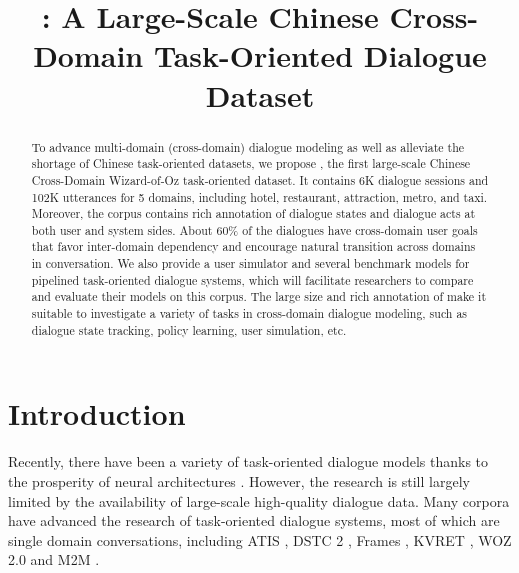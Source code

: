 \title{\datasetName: A Large-Scale Chinese Cross-Domain Task-Oriented Dialogue Dataset}



\maketitle

\renewcommand{\thefootnote}{\fnsymbol{footnote}}

\begin{abstract}
To advance multi-domain (cross-domain) dialogue modeling as well as alleviate the shortage of Chinese task-oriented datasets, we propose \textbf{\datasetName}, the first large-scale Chinese Cross-Domain Wizard-of-Oz task-oriented dataset. It contains 6K dialogue sessions and 102K utterances for 5 domains, including hotel, restaurant, attraction, metro, and taxi. Moreover, the corpus contains rich annotation of dialogue states and dialogue acts at both user and system sides. About 60\% of the dialogues have cross-domain user goals that favor inter-domain dependency and encourage natural transition across domains in conversation. We also provide a user simulator and several benchmark models for pipelined task-oriented dialogue systems, which will facilitate researchers to compare and evaluate their models on this corpus.
The large size and rich annotation of \textbf{\datasetName} make it suitable to investigate a variety of tasks in cross-domain dialogue modeling, such as dialogue state tracking, policy learning, user simulation, etc.
\end{abstract}

\section{Introduction}
\label{section1}
Recently, there have been a variety of task-oriented dialogue models thanks to the prosperity of neural architectures \cite{yao2013rnnNLU,wen2015sclstm,mrkvsic2017neuralDST,HRL,lei2018sequicity,gur2018user}. 
However, the research is still largely limited by the availability of large-scale high-quality dialogue data. Many corpora have advanced the research of task-oriented dialogue systems, most of which are single domain conversations, including ATIS \cite{ATIS1990}, DSTC 2 \cite{DSTC2}, Frames \cite{frames2017}, KVRET \cite{KVRET2017}, WOZ 2.0 \cite{Camrest2017} and M2M \cite{M2M2018}. 

